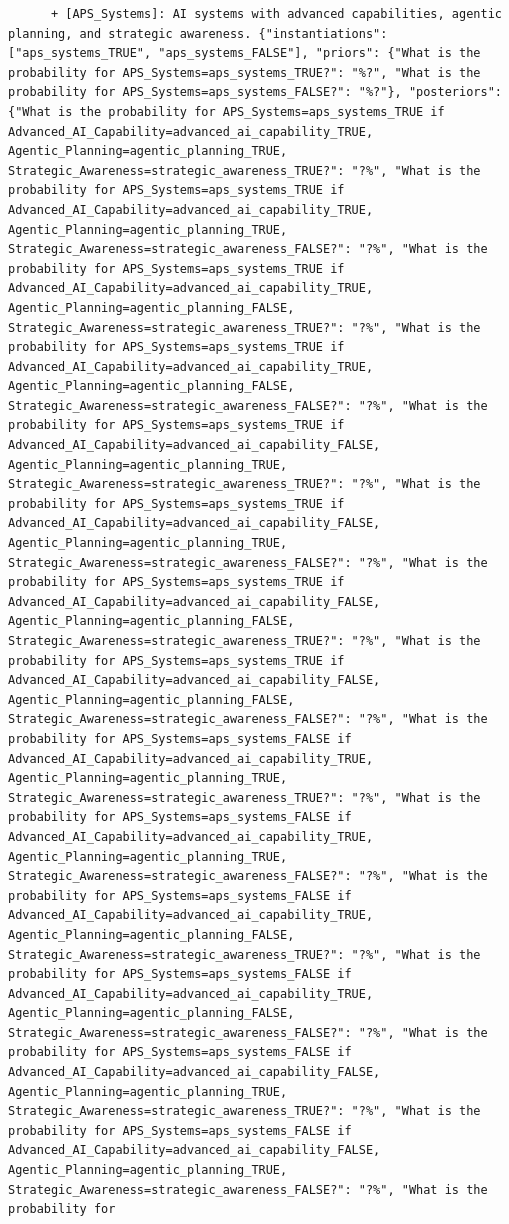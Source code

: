 \documentclass[
  11pt,
  letterpaper,
]{book}
\begin{document}
\begin{landscape}
\begin{verbatim}
      + [APS_Systems]: AI systems with advanced capabilities, agentic planning, and strategic awareness. {"instantiations": ["aps_systems_TRUE", "aps_systems_FALSE"], "priors": {"What is the probability for APS_Systems=aps_systems_TRUE?": "%?", "What is the probability for APS_Systems=aps_systems_FALSE?": "%?"}, "posteriors": {"What is the probability for APS_Systems=aps_systems_TRUE if Advanced_AI_Capability=advanced_ai_capability_TRUE, Agentic_Planning=agentic_planning_TRUE, Strategic_Awareness=strategic_awareness_TRUE?": "?%", "What is the probability for APS_Systems=aps_systems_TRUE if Advanced_AI_Capability=advanced_ai_capability_TRUE, Agentic_Planning=agentic_planning_TRUE, Strategic_Awareness=strategic_awareness_FALSE?": "?%", "What is the probability for APS_Systems=aps_systems_TRUE if Advanced_AI_Capability=advanced_ai_capability_TRUE, Agentic_Planning=agentic_planning_FALSE, Strategic_Awareness=strategic_awareness_TRUE?": "?%", "What is the probability for APS_Systems=aps_systems_TRUE if Advanced_AI_Capability=advanced_ai_capability_TRUE, Agentic_Planning=agentic_planning_FALSE, Strategic_Awareness=strategic_awareness_FALSE?": "?%", "What is the probability for APS_Systems=aps_systems_TRUE if Advanced_AI_Capability=advanced_ai_capability_FALSE, Agentic_Planning=agentic_planning_TRUE, Strategic_Awareness=strategic_awareness_TRUE?": "?%", "What is the probability for APS_Systems=aps_systems_TRUE if Advanced_AI_Capability=advanced_ai_capability_FALSE, Agentic_Planning=agentic_planning_TRUE, Strategic_Awareness=strategic_awareness_FALSE?": "?%", "What is the probability for APS_Systems=aps_systems_TRUE if Advanced_AI_Capability=advanced_ai_capability_FALSE, Agentic_Planning=agentic_planning_FALSE, Strategic_Awareness=strategic_awareness_TRUE?": "?%", "What is the probability for APS_Systems=aps_systems_TRUE if Advanced_AI_Capability=advanced_ai_capability_FALSE, Agentic_Planning=agentic_planning_FALSE, Strategic_Awareness=strategic_awareness_FALSE?": "?%", "What is the probability for APS_Systems=aps_systems_FALSE if Advanced_AI_Capability=advanced_ai_capability_TRUE, Agentic_Planning=agentic_planning_TRUE, Strategic_Awareness=strategic_awareness_TRUE?": "?%", "What is the probability for APS_Systems=aps_systems_FALSE if Advanced_AI_Capability=advanced_ai_capability_TRUE, Agentic_Planning=agentic_planning_TRUE, Strategic_Awareness=strategic_awareness_FALSE?": "?%", "What is the probability for APS_Systems=aps_systems_FALSE if Advanced_AI_Capability=advanced_ai_capability_TRUE, Agentic_Planning=agentic_planning_FALSE, Strategic_Awareness=strategic_awareness_TRUE?": "?%", "What is the probability for APS_Systems=aps_systems_FALSE if Advanced_AI_Capability=advanced_ai_capability_TRUE, Agentic_Planning=agentic_planning_FALSE, Strategic_Awareness=strategic_awareness_FALSE?": "?%", "What is the probability for APS_Systems=aps_systems_FALSE if Advanced_AI_Capability=advanced_ai_capability_FALSE, Agentic_Planning=agentic_planning_TRUE, Strategic_Awareness=strategic_awareness_TRUE?": "?%", "What is the probability for APS_Systems=aps_systems_FALSE if Advanced_AI_Capability=advanced_ai_capability_FALSE, Agentic_Planning=agentic_planning_TRUE, Strategic_Awareness=strategic_awareness_FALSE?": "?%", "What is the probability for 
\end{verbatim}
\end{landscape}
\end{document}
